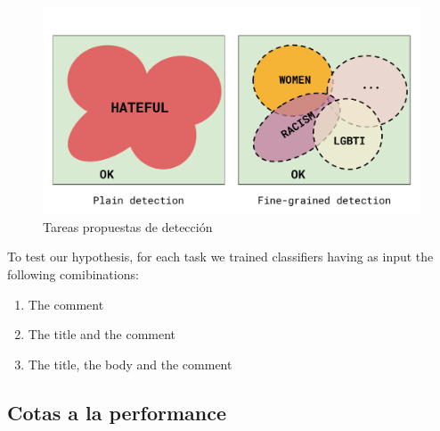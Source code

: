 
\begin{figure}[t]
    \centering
    \includegraphics[width=\textwidth]{img/hate_detection_tasks.pdf}
    \caption{Tareas propuestas de detección}
    \label{fig:hate_detection_tasks}
\end{figure}

To test our hypothesis, for each task we trained classifiers having as input the following comibinations:

\begin{enumerate}
    \item The comment
    \item The title and the comment
    \item The title, the body and the comment
\end{enumerate}


\subsection{Cotas a la performance}

